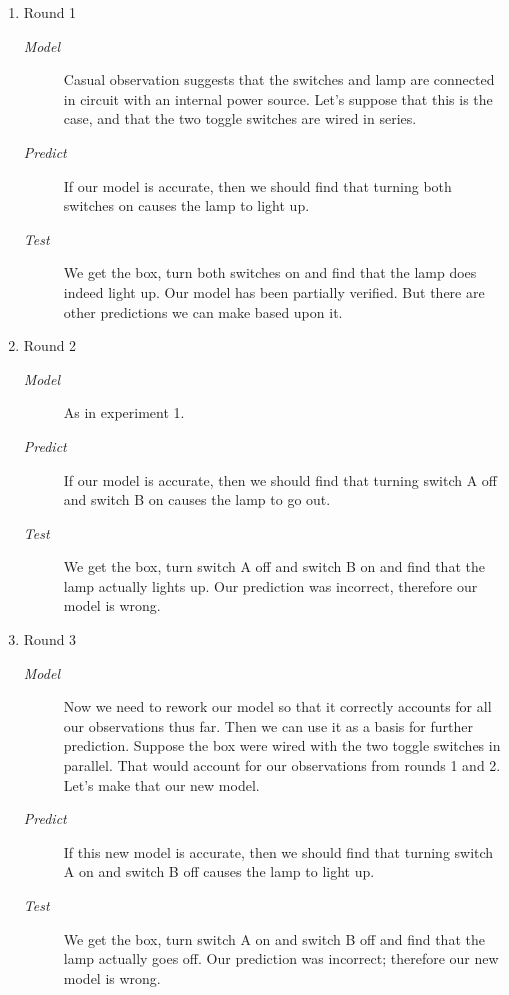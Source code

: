 \documentclass{article}
\begin{document}
\begin{enumerate}
\begin{enumerate}
\item Round 1
\label{sec:orgheadline388}

\begin{description}
\item[{\emph{Model}}] Casual observation suggests that the switches and lamp are
connected in circuit with an internal power source. Let's suppose
that this is the case, and that the two toggle switches are wired in
series.
\item[{\emph{Predict}}] If our model is accurate, then we should find that
turning both switches on causes the lamp to light up.
\item[{\emph{Test}}] We get the box, turn both switches on and find that the
lamp does indeed light up. Our model has been partially verified. But
there are other predictions we can make based upon it.
\end{description}

\item Round 2
\label{sec:orgheadline389}

\begin{description}
\item[{\emph{Model}}] As in experiment 1.
\item[{\emph{Predict}}] If our model is accurate, then we should find that
turning switch A off and switch B on causes the lamp to go out.
\item[{\emph{Test}}] We get the box, turn switch A off and switch B on and find
that the lamp actually lights up. Our prediction was incorrect,
therefore our model is wrong.
\end{description}

\item Round 3
\label{sec:orgheadline390}

\begin{description}
\item[{\emph{Model}}] Now we need to rework our model so that it correctly
accounts for all our observations thus far. Then we can use it as a
basis for further prediction. Suppose the box were wired with the two
toggle switches in parallel. That would account for our observations
from rounds 1 and 2. Let's make that our new model.
\item[{\emph{Predict}}] If this new model is accurate, then we should find that
turning switch A on and switch B off causes the lamp to light up.
\item[{\emph{Test}}] We get the box, turn switch A on and switch B off and find
that the lamp actually goes off. Our prediction was incorrect;
therefore our new model is wrong.
\end{description}


\end{enumerate}
\end{enumerate}
\end{document}
